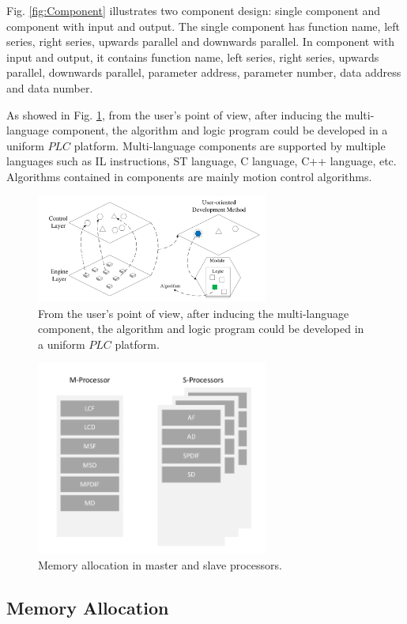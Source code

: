 \documentclass[journal,UTF8]{IEEEtran}
\begin{document}
Fig. \ref{fig:Component} illustrates two component design: single component and component with input and output. The single component has function name, left series, right series, upwards parallel and downwards parallel. In component with input and output, it contains function name, left series, right series, upwards parallel, downwards parallel, parameter address, parameter number, data address and data number.

As showed in Fig. \ref{fig:SoftwareStructure}, from the user's point of view, after inducing the multi-language component, the algorithm and logic program could be developed in a uniform $PLC$ platform. Multi-language components are supported by multiple languages such as IL instructions, ST language, C language, C++ language, etc. Algorithms contained in components are mainly motion control algorithms.
\begin{figure}
	\centering
	\includegraphics[width=3in]{fig/FIG3.pdf}
	\caption{ From the user's point of view, after inducing the multi-language component, the algorithm and logic program could be developed in a uniform $PLC$ platform.}
	\label{fig:SoftwareStructure}
\end{figure}


\begin{figure}
	\centering
	\includegraphics[width=3in]{fig/FIG4.pdf}
	\caption{ Memory allocation in master and slave processors.}
	\label{fig:Memory}
\end{figure}

\subsection{Memory Allocation}  
\end{document}
